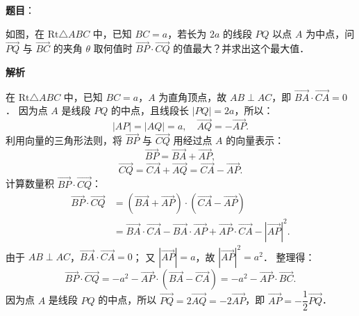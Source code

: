 \begin{answer}

\textbf{题目}：

如图，在 $\mathrm{Rt}\triangle ABC$ 中，已知 $BC = a$，若长为 $2a$ 的线段 $PQ$ 以点 $A$ 为中点，问 $\vec{PQ}$ 与 $\vec{BC}$ 的夹角 $\theta$ 取何值时 $\vec{BP} \cdot \vec{CQ}$ 的值最大？并求出这个最大值．
\nopagebreak[4]
\begin{center}\end{center}
\nopagebreak[4]
\textbf{解析}
\nopagebreak[4]
\begin{center}\end{center}
\nopagebreak[4]
在 $\mathrm{Rt}\triangle ABC$ 中，已知 $BC = a$，$A$ 为直角顶点，故 $AB \perp AC$，即 $\overrightarrow{BA} \cdot \overrightarrow{CA} = 0$．
因为点 $A$ 是线段 $PQ$ 的中点，且线段长 $|PQ| = 2a$，所以：
\nopagebreak[4]
\[
|AP| = |AQ| = a, \quad \overrightarrow{AQ} = -\overrightarrow{AP}.
\]
利用向量的三角形法则，将 $\overrightarrow{BP}$ 与 $\overrightarrow{CQ}$ 用经过点 $A$ 的向量表示：
\nopagebreak[4]
\[
\overrightarrow{BP} = \overrightarrow{BA} + \overrightarrow{AP},
\]
\nopagebreak[4]
\[
\overrightarrow{CQ} = \overrightarrow{CA} + \overrightarrow{AQ} = \overrightarrow{CA} - \overrightarrow{AP}.
\]
计算数量积 $\overrightarrow{BP} \cdot \overrightarrow{CQ}$：
\nopagebreak[4]
\[
\begin{aligned}
\overrightarrow{BP} \cdot \overrightarrow{CQ} &= (\overrightarrow{BA} + \overrightarrow{AP}) \cdot (\overrightarrow{CA} - \overrightarrow{AP}) \\
&= \overrightarrow{BA} \cdot \overrightarrow{CA} - \overrightarrow{BA} \cdot \overrightarrow{AP} + \overrightarrow{AP} \cdot \overrightarrow{CA} - |\overrightarrow{AP}|^2.
\end{aligned}
\]
由于 $AB \perp AC$，$\overrightarrow{BA} \cdot \overrightarrow{CA} = 0$；
又 $|\overrightarrow{AP}| = a$，故 $|\overrightarrow{AP}|^2 = a^2$．
整理得：
\nopagebreak[4]
\[
\overrightarrow{BP} \cdot \overrightarrow{CQ} = -a^2 - \overrightarrow{AP} \cdot (\overrightarrow{BA} - \overrightarrow{CA}) = -a^2 - \overrightarrow{AP} \cdot \overrightarrow{BC}.
\]
因为点 $A$ 是线段 $PQ$ 的中点，所以 $\overrightarrow{PQ} = 2\overrightarrow{AQ} = -2\overrightarrow{AP}$，即 $\overrightarrow{AP} = -\dfrac{1}{2}\overrightarrow{PQ}$．

\end{answer}
